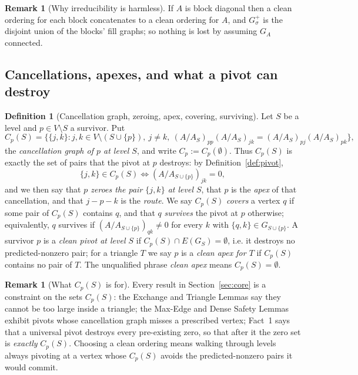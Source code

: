 \documentclass[11pt]{article}
\theoremstyle{plain}
\theoremstyle{definition}
\newtheorem{definition}[theorem]{Definition}
\newtheorem{remark}[theorem]{Remark}
\begin{document}
\begin{aiblock}
\begin{remark}[Why irreducibility is harmless]\label{rem:irred-harmless}
If $A$ is block diagonal then a clean ordering for each block concatenates to a clean ordering for
$A$, and $G^+_\sigma$ is the disjoint union of the blocks' fill graphs; so nothing is lost by assuming
$G_A$ connected.
\end{remark}

\subsection{Cancellations, apexes, and what a pivot can destroy}

\begin{definition}[Cancellation graph, zeroing, apex, covering, surviving]\label{def:cancel}
Let $S$ be a level and $p\in V\setminus S$ a survivor. Put
\[
C_p(S)=\bigl\{\{j,k\}: j,k\in V\setminus(S\cup\{p\}),\ j\neq k,\
(A/A_S)_{pp}(A/A_S)_{jk}=(A/A_S)_{pj}(A/A_S)_{pk}\bigr\},
\]
the \emph{cancellation graph of $p$ at level $S$}, and write $C_p:=C_p(\emptyset)$. Thus
$C_p(S)$ is exactly the set of pairs that the pivot at $p$ destroys: by
Definition~\ref{def:pivot},
\[
\{j,k\}\in C_p(S)\iff (A/A_{S\cup\{p\}})_{jk}=0 ,
\]
and we then say that \emph{$p$ zeroes the pair $\{j,k\}$ at level $S$}, that $p$ is the \emph{apex} of
that cancellation, and that $j-p-k$ is the \emph{route}. We say $C_p(S)$ \emph{covers} a vertex $q$ if
some pair of $C_p(S)$ contains $q$, and that $q$ \emph{survives} the pivot at $p$ otherwise;
equivalently, $q$ survives if $(A/A_{S\cup\{p\}})_{qk}\neq0$ for every $k$ with
$\{q,k\}\in G_{S\cup\{p\}}$. A survivor $p$ is a \emph{clean pivot at level $S$} if
$C_p(S)\cap E(G_S)=\emptyset$, i.e. it destroys no predicted-nonzero pair; for a triangle
$T$ we say $p$ is a \emph{clean apex for $T$} if $C_p(S)$ contains no pair of $T$. The unqualified
phrase \emph{clean apex} means $C_p(S)=\emptyset$.
\end{definition}

\begin{remark}[What $C_p(S)$ is for]\label{rem:Cp-role}
Every result in Section~\ref{sec:core} is a constraint on the sets $C_p(S)$: the Exchange and Triangle
Lemmas say they cannot be too large inside a triangle; the Max-Edge and Dense Safety Lemmas exhibit
pivots whose cancellation graph misses a prescribed vertex; Fact~1 says that a universal pivot
destroys every pre-existing zero, so that after it the zero set is \emph{exactly} $C_p(S)$. Choosing a
clean ordering means walking through levels always pivoting at a vertex whose $C_p(S)$ avoids the
predicted-nonzero pairs it would commit.
\end{remark}


\end{aiblock}
\end{document}
